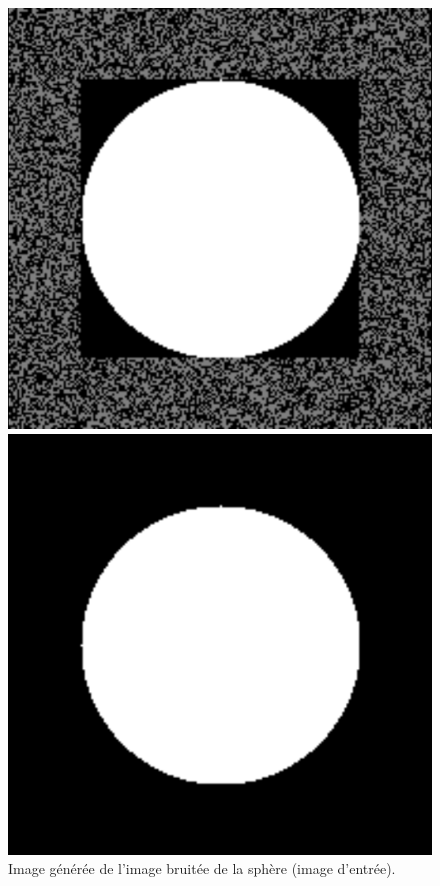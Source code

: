 \documentclass{article}
\begin{document}
{{{{\begin{figure}[!p]
                    \begin{minipage}[t]{0.45\textwidth}
                        \centering
                        \includegraphics[width=\textwidth]{images/test-roi-selection-volume.png}
                        \caption{Image générée de l'image bruitée de la sphère (image d'entrée).}
                        \label{fig:test-roi-selection-volume}
                    \end{minipage}
                    \hfill
                    \begin{minipage}[t]{0.45\textwidth}
                        \centering
                        \includegraphics[width=\textwidth]{images/test-roi-selection-roi.png}

\end{minipage}
\end{figure}}}}}
\end{document}
